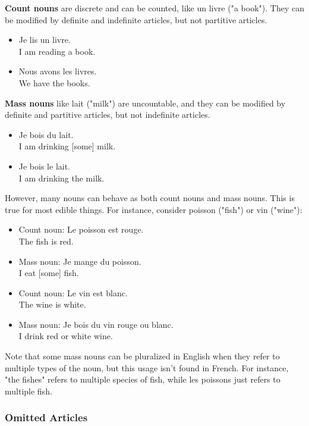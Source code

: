 \textbf{Count nouns} are discrete and can be counted, like un livre ("a book"). They can be modified by definite and indefinite articles, but not partitive articles.

\begin{itemize}
  \item  Je lis un livre. \\ I am reading a book.
  \item  Nous avons les livres. \\ We have the books.
\end{itemize}

\textbf{Mass nouns} like lait ("milk") are uncountable, and they can be modified by definite and partitive articles, but not indefinite articles.

\begin{itemize}
  \item  Je bois du lait. \\ I am drinking [some] milk.
  \item  Je bois le lait. \\ I am drinking the milk.
\end{itemize}

However, many nouns can behave as both count nouns and mass nouns. This is true for most edible things. For instance, consider poisson ("fish") or vin ("wine"):

\begin{itemize}
  \item  Count noun: Le poisson est rouge. \\ The fish is red.
  \item  Mass noun: Je mange du poisson. \\ I eat [some] fish.
  \item  Count noun: Le vin est blanc. \\ The wine is white.
  \item  Mass noun: Je bois du vin rouge ou blanc. \\ I drink red or white wine.
\end{itemize}

Note that some mass nouns can be pluralized in English when they refer to multiple types of the noun, but this usage isn't found in French. For instance, "the fishes" refers to multiple species of fish, while les poissons just refers to multiple fish.

\subsubsection{Omitted Articles}

